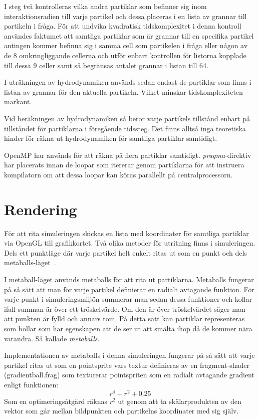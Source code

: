 \documentclass[a4paper,12pt,oneside,final]{extarticle}
\begin{document}
I steg två kontrolleras vilka andra partiklar som befinner sig inom interaktionsradien till varje partikel och dessa placeras i en lista av grannar till partikeln i fråga.
För att undvika kvadratisk tidskomplexitet i denna kontroll användes faktumet att samtliga partiklar som är grannar till en specifika partikel antingen kommer befinna sig i samma cell som partikelen i fråga eller någon av de 8 omkringliggande cellerna och utför enbart kontrollen för listorna kopplade till dessa 9 celler samt så begränsas antalet grannar i listan till 64.

I uträkningen av hydrodynamiken används sedan endast de partiklar som finns i listan av grannar för den aktuella partikeln.
Vilket minskar tidskomplexiteten markant.

Vid beräkningen av hydrodynamiken så beror varje partikels tillstånd enbart på tillståndet för partiklarna i föregående tidssteg.
Det finns alltså inga teoretiska hinder för räkna ut hydrodynamiken för samtliga partiklar samtidigt.

OpenMP \cite{openmp} har används för att räkna på flera partiklar samtidigt.
\textit{pragma}-direktiv har placerats innan de loopar som itererar genom partiklarna för att instruera kompilatorn om att dessa loopar kan köras parallellt på centralprocessorn.

\section{Rendering}
För att rita simuleringen skickas en lista med koordinater för samtliga partiklar via OpenGL till grafikkortet.
Två olika metoder för utritning finns i simuleringen.
Dels ett punktläge där varje partikel helt enkelt ritas ut som en punkt och dels metaballs-läget~\cite{blinn}.

I metaball-läget används metaballs för att rita ut partiklarna.
Metaballs fungerar på så sätt att man för varje partikel definierar en radialt avtagande funktion.
För varje punkt i simuleringsmiljön summerar man sedan dessa funktioner och kollar ifall summan är över ett tröskelvärde.
Om den är över tröskelvärdet säger man att punkten är fylld och annars tom.
På detta sätt kan partiklar representeras som bollar som har egenskapen att de ser ut att smälta ihop då de kommer nära varandra.
Så kallade \textit{metaballs}.

Implementationen av metaballs i denna simuleringen fungerar på så sätt att varje partikel ritas ut som en pointsprite vars textur definieras av en fragment-shader (gradientball.frag) som texturerar pointspriten som en radialt avtagande gradient enligt funktionen:
\begin{equation}
r^{4} -r^{2} + 0.25
\end{equation}
Som en optimeringsåtgärd räknas $ r^{2} $ ut genom att ta skälarprodukten av den vektor som går mellan bildpunkten och partikelns koordinater med sig själv.
\end{document}
